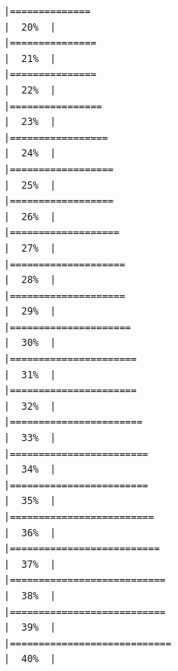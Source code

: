 \documentclass[
]{article}
\begin{document}
\begin{verbatim}
|==============                                                        |  20%  |                                                                              |===============                                                       |  21%  |                                                                              |===============                                                       |  22%  |                                                                              |================                                                      |  23%  |                                                                              |=================                                                     |  24%  |                                                                              |==================                                                    |  25%  |                                                                              |==================                                                    |  26%  |                                                                              |===================                                                   |  27%  |                                                                              |====================                                                  |  28%  |                                                                              |====================                                                  |  29%  |                                                                              |=====================                                                 |  30%  |                                                                              |======================                                                |  31%  |                                                                              |======================                                                |  32%  |                                                                              |=======================                                               |  33%  |                                                                              |========================                                              |  34%  |                                                                              |========================                                              |  35%  |                                                                              |=========================                                             |  36%  |                                                                              |==========================                                            |  37%  |                                                                              |===========================                                           |  38%  |                                                                              |===========================                                           |  39%  |                                                                              |============================                                          |  40%  |                                                                              
\end{verbatim}
\end{document}
